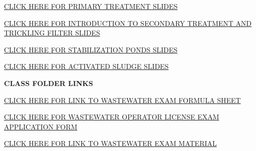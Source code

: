 \documentclass{article}
\begin{document}
\begin{tcolorbox}[width=17cm,box align=center, halign=center,  valign=center,colback={my-blue},title={}, colbacktitle=yellow,coltitle=blue]    
\href{https://sbasrai.github.io/Primary_Treatment/}{CLICK HERE FOR PRIMARY TREATMENT SLIDES}
\end{tcolorbox} 

\begin{tcolorbox}[width=17cm,box align=center, halign=center,  valign=center,colback={my-blue},title={}, colbacktitle=yellow,coltitle=blue]    
\href{https://sbasrai.github.io/IntroductiontoSecondaryTreatmentandTricklingFilters/}{CLICK HERE FOR INTRODUCTION TO SECONDARY TREATMENT AND TRICKLING FILTER SLIDES}
\end{tcolorbox}

\begin{tcolorbox}[width=17cm,box align=center, halign=center,  valign=center,colback={my-blue},title={}, colbacktitle=yellow,coltitle=blue]    
\href{https://sbasrai.github.io/Stabilization_Ponds/}{CLICK HERE FOR STABILIZATION PONDS SLIDES}
\end{tcolorbox}

\begin{tcolorbox}[width=17cm,box align=center, halign=center,  valign=center,colback={my-blue},title={}, colbacktitle=yellow,coltitle=blue]    
\href{https://sbasrai.github.io/Activated_Sludge_Revised/}{CLICK HERE FOR ACTIVATED SLUDGE SLIDES}
\end{tcolorbox} 

\textbf{CLASS FOLDER LINKS}

\begin{tcolorbox}[width=17cm,box align=center, halign=center,  valign=center,colback={my-blue},title={}, colbacktitle=yellow,coltitle=blue]    
\href{https://drive.google.com/file/d/1BPez25mIjKvVi5f9bCbC5TUVdUvlnsaC/view?usp=sharing}{CLICK HERE FOR LINK TO WASTEWATER EXAM FORMULA SHEET}
\end{tcolorbox}

\begin{tcolorbox}[width=17cm,box align=center, halign=center,  valign=center,colback={my-blue},title={}, colbacktitle=yellow,coltitle=blue]    
\href{https://www.waterboards.ca.gov/water_issues/programs/operator_certification/docs/forms/exam_app.pdf}{CLICK HERE FOR WASTEWATER OPERATOR LICENSE EXAM APPLICATION FORM}
\end{tcolorbox} 

\begin{tcolorbox}[width=17cm,box align=center, halign=center,  valign=center,colback={my-blue},title={}, colbacktitle=yellow,coltitle=blue]    
\href{https://drive.google.com/drive/folders/1zZqhq0f-6Ts4zeHfPE3xaIML0KHDyjzm?usp=sharing}{CLICK HERE FOR LINK TO WASTEWATER EXAM MATERIAL}
\end{tcolorbox}
\end{document}
